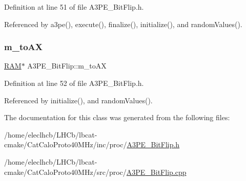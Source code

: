 Definition at line 51 of file A3\+P\+E\+\_\+\+Bit\+Flip.\+h.



Referenced by a3pe(), execute(), finalize(), initialize(), and random\+Values().

\mbox{\label{classA3PE__BitFlip_a0ac416167c83d423cda4e09a892b5255}} 
\subsubsection{\texorpdfstring{m\+\_\+to\+AX}{m\_toAX}}
{\footnotesize\ttfamily \hyperlink{classRAM}{R\+AM}$\ast$ A3\+P\+E\+\_\+\+Bit\+Flip\+::m\+\_\+to\+AX\hspace{0.3cm}{\ttfamily [private]}}



Definition at line 52 of file A3\+P\+E\+\_\+\+Bit\+Flip.\+h.



Referenced by initialize(), and random\+Values().



The documentation for this class was generated from the following files\+:\begin{DoxyCompactItemize}
\item 
/home/eleclhcb/\+L\+H\+Cb/lbcat-\/cmake/\+Cat\+Calo\+Proto40\+M\+Hz/inc/proc/\hyperlink{A3PE__BitFlip_8h}{A3\+P\+E\+\_\+\+Bit\+Flip.\+h}\item 
/home/eleclhcb/\+L\+H\+Cb/lbcat-\/cmake/\+Cat\+Calo\+Proto40\+M\+Hz/src/proc/\hyperlink{A3PE__BitFlip_8cpp}{A3\+P\+E\+\_\+\+Bit\+Flip.\+cpp}\end{DoxyCompactItemize}
